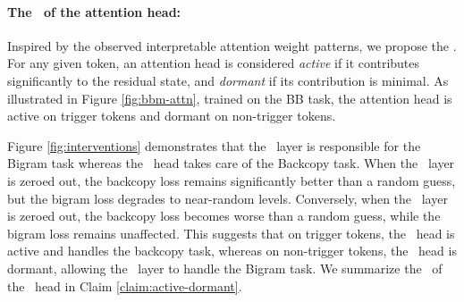 
\paragraph{The \activedormant~of the attention head:} Inspired by the observed interpretable attention weight patterns, we propose the \textit{\activedormant}. For any given token, an attention head is considered \textit{active} if it contributes significantly to the residual state, and \textit{dormant} if its contribution is minimal. As illustrated in Figure \ref{fig:bbm-attn}, trained on the BB task, the attention head is active on trigger tokens and dormant on non-trigger tokens. 

Figure \ref{fig:interventions} demonstrates that the \mlp~layer is responsible for the Bigram task whereas the \attn~head takes care of the Backcopy task. When the \mlp~layer is zeroed out, the backcopy loss remains significantly better than a random guess, but the bigram loss degrades to near-random levels. Conversely, when the \attn~layer is zeroed out, the backcopy loss becomes worse than a random guess, while the bigram loss remains unaffected. This suggests that on trigger tokens, the \attn~head is active and handles the backcopy task, whereas on non-trigger tokens, the \attn~head is dormant, allowing the \mlp~layer to handle the Bigram task. We summarize the \activedormant~of the \attn~head in Claim \ref{claim:active-dormant}.

